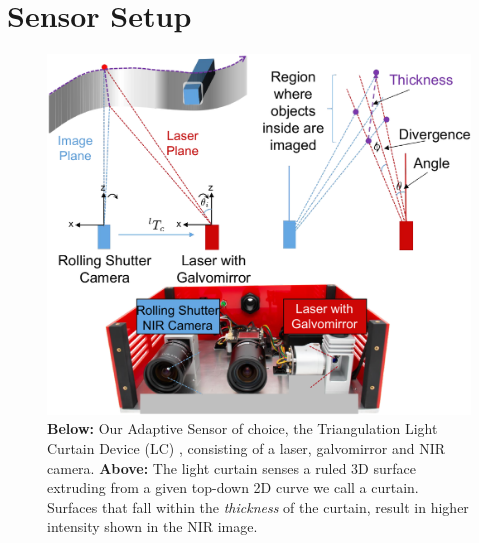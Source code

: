 
\section{Sensor Setup}

\begin{figure}[h]
   \centering
   \begin{minipage}{0.5\textwidth}
       \centering
       \includegraphics[width=1.0\textwidth]{figures/LC.pdf} %
   \end{minipage}\hfill
   \centering
   \caption{ \textbf{Below:}  Our Adaptive Sensor of choice, the Triangulation Light Curtain Device (LC) \cite{bartels2019Agile}, consisting of a laser, galvomirror and NIR camera. \textbf{Above:} The light curtain senses a ruled 3D surface extruding from a given top-down 2D curve we call a curtain. Surfaces that fall within the \textit{thickness} of the curtain, result in higher intensity shown in the NIR image.}
   \label{fig:lcdevice}  
\end{figure}

